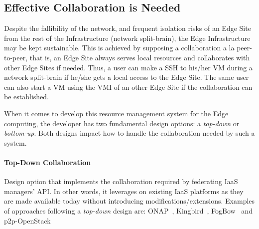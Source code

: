 \subsection{Effective Collaboration is Needed}

Despite the fallibility of the network, and frequent isolation risks
of an Edge Site from the rest of the Infrastructure (\ie network
split-brain), the Edge Infrastructure may be kept sustainable. This is
achieved by supposing a collaboration a la peer-to-peer, that is, an
Edge Site always serves local resources and collaborates with other
Edge Sites if needed. Thus, a user can make a SSH to his/her VM during a
network split-brain if he/she gets a local access to the Edge Site. The
same user can also start a VM using the VMI of an other Edge Site if
the collaboration can be established.

When it comes to develop this resource management system for the Edge
computing, the developer has two fundamental design options: a \emph{top-down} or
\emph{bottom-up}. Both designs impact how to handle the
collaboration needed by such a system.

\paragraph{Top-Down Collaboration}
Design option that implements the collaboration required by
federating IaaS managers' API. In other words, it leverages on existing IaaS platforms as they are made available today without introducing modifications/extensions. Examples of approaches following a \emph{top-down} design are: ONAP~\cite{onap}, Kingbird~\cite{kingbird}, FogBow~\cite{brasileiro2016fogbow} and p2p-OpenStack~\cite{ericsson-p2p}


